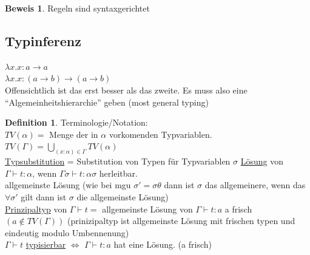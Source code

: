 \documentclass{article}
\theoremstyle{definition}
\newtheorem{beweis}{Beweis}[section]
\newtheorem{definition}{Definition}[section]
\begin{document}
	\begin{beweis} Regeln sind syntaxgerichtet\end{beweis}
	\subsection{Typinferenz}
	$\lambda x.x:a \to a$\\
	$\lambda x.x:(a\to b)\to(a\to b)$\\
	Offensichtlich ist das erst besser als das zweite. Es muss also eine ``Algemeinheitshierarchie'' geben (most general typing)\\
	\begin{definition}
	Terminologie/Notation:\\
	$TV(\alpha)=$ Menge der in $\alpha$ vorkomenden Typvariablen.\\
	$TV(\Gamma)=\bigcup\limits_{(x:\alpha)\in\Gamma}TV(\alpha)$\\
	\underline{Typsubstitution} = Substitution von Typen für  Typvariablen
	$\sigma$ \underline{Lösung} von $\Gamma\vdash t:\alpha$, wenn $\Gamma\sigma\vdash t:\alpha\sigma$ herleitbar.\\
	allgemeinste Lösung (wie bei mgu $\sigma' =\sigma \theta$ dann ist $\sigma$ das allgemeinere, wenn das $\forall \sigma'$ gilt dann ist $\sigma$ die allgemeinste Lösung)\\
	\underline{Prinzipaltyp} von $\Gamma\vdash t=$ allgemeinste Lösung von $\Gamma\vdash t:a$ a frisch $(a\notin TV(\Gamma))$ (prinizipaltyp ist allgemeinste Lösung mit frischen typen und eindeutig modulo Umbennenung)\\
	$\Gamma\vdash t$ \underline{typisierbar} $\iff$ $\Gamma\vdash t:a$ hat eine Lösung. (a frisch)\\
	\end{definition}
\end{document}
